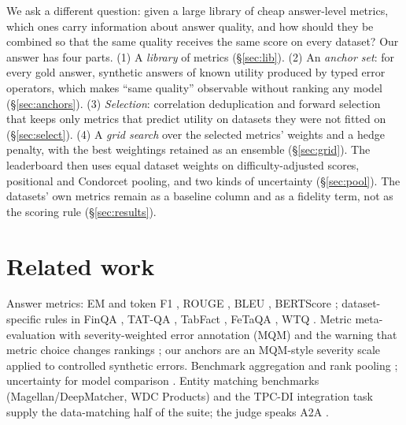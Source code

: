 \documentclass[10pt,twocolumn]{article}
\begin{document}
We ask a different question: given a large library of cheap answer-level metrics, which ones carry information about answer quality, and how should they be combined so that the same quality receives the same score on every dataset? Our answer has four parts. (1) A \emph{library} of \nMetrics{} metrics (\S\ref{sec:lib}). (2) An \emph{anchor set}: for every gold answer, synthetic answers of known utility produced by typed error operators, which makes ``same quality'' observable without ranking any model (\S\ref{sec:anchors}). (3) \emph{Selection}: correlation deduplication and forward selection that keeps only metrics that predict utility on datasets they were not fitted on (\S\ref{sec:select}). (4) A \emph{grid search} over the selected metrics' weights and a hedge penalty, with the \topK{} best weightings retained as an ensemble (\S\ref{sec:grid}). The leaderboard then uses equal dataset weights on difficulty-adjusted scores, positional and Condorcet pooling, and two kinds of uncertainty (\S\ref{sec:pool}). The datasets' own metrics remain as a baseline column and as a fidelity term, not as the scoring rule (\S\ref{sec:results}).

\section{Related work}
Answer metrics: EM and token F1 \citep{rajpurkar2016squad}, ROUGE \citep{lin2004rouge}, BLEU \citep{papineni2002bleu}, BERTScore \citep{zhang2020bertscore}; dataset-specific rules in FinQA \citep{chen2021finqa}, TAT-QA \citep{zhu2021tatqa}, TabFact \citep{chen2020tabfact}, FeTaQA \citep{nan2022fetaqa}, WTQ \citep{pasupat2015wtq}. Metric meta-evaluation with severity-weighted error annotation (MQM) \citep{lommel2014mqm,freitag2021experts} and the warning that metric choice changes rankings \citep{mathur2020tangled}; our anchors are an MQM-style severity scale applied to controlled synthetic errors. Benchmark aggregation and rank pooling \citep{liang2022helm,colombo2022ranking,dwork2001rank,young1978consistent,cormack2009rrf}; uncertainty for model comparison \citep{dror2019deep}. Entity matching benchmarks (Magellan/DeepMatcher, WDC Products) and the TPC-DI integration task \citep{tpcdi2014} supply the data-matching half of the suite; the judge speaks A2A \citep{a2a2025}.
\end{document}
